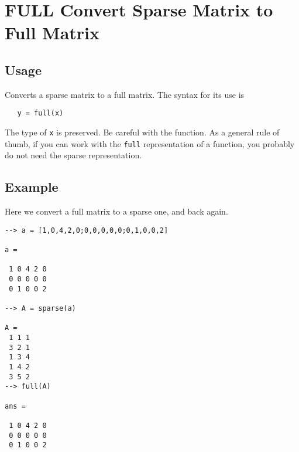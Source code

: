 \section{FULL Convert Sparse Matrix to Full Matrix}

\subsection{Usage}

Converts a sparse matrix to a full matrix.  The syntax for
its use is
\begin{verbatim}
   y = full(x)
\end{verbatim}
The type of \verb|x| is preserved.  Be careful with the function.
As a general rule of thumb, if you can work with the \verb|full|
representation of a function, you probably do not need the
sparse representation.
\subsection{Example}

Here we convert a full matrix to a sparse one, and back again.
\begin{verbatim}
--> a = [1,0,4,2,0;0,0,0,0,0;0,1,0,0,2]

a = 

 1 0 4 2 0 
 0 0 0 0 0 
 0 1 0 0 2 

--> A = sparse(a)

A = 
 1 1 1
 3 2 1
 1 3 4
 1 4 2
 3 5 2
--> full(A)

ans = 

 1 0 4 2 0 
 0 0 0 0 0 
 0 1 0 0 2 
\end{verbatim}
